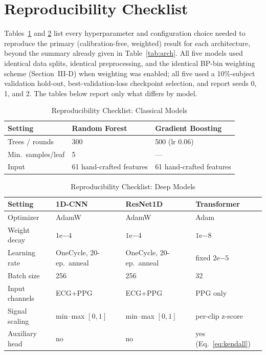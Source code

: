 \documentclass[journal]{IEEEtran}
\begin{document}
\appendix
\section{Reproducibility Checklist}
Tables~\ref{tab:repro-classical} and \ref{tab:repro-deep} list every hyperparameter and configuration choice needed to reproduce the primary (calibration-free, weighted) result for each architecture, beyond the summary already given in Table~\ref{tab:arch}. All five models used identical data splits, identical preprocessing, and the identical BP-bin weighting scheme (Section~III-D) when weighting was enabled; all five used a 10\%-subject validation hold-out, best-validation-loss checkpoint selection, and report seeds 0, 1, and 2. The tables below report only what differs by model.

\begin{table}[!t]
\caption{Reproducibility Checklist: Classical Models}
\label{tab:repro-classical}
\centering
\footnotesize
\begin{tabular}{lp{2.5cm}p{2.5cm}}
\toprule
Setting & Random Forest & Gradient Boosting \\
\midrule
Trees / rounds & 300 & 500 (lr 0.06) \\
Min.\ samples/leaf & 5 & --- \\
Input & 61 hand-crafted features & 61 hand-crafted features \\
\bottomrule
\end{tabular}
\end{table}

\begin{table}[!t]
\caption{Reproducibility Checklist: Deep Models}
\label{tab:repro-deep}
\centering
\footnotesize
\begin{tabular}{lp{1.65cm}p{1.65cm}p{1.65cm}}
\toprule
Setting & 1D-CNN & ResNet1D & Transformer \\
\midrule
Optimizer & AdamW & AdamW & Adam \\
Weight decay & $1\mathrm{e}{-4}$ & $1\mathrm{e}{-4}$ & $1\mathrm{e}{-8}$ \\
Learning rate & OneCycle, 20-ep.\ anneal & OneCycle, 20-ep.\ anneal & fixed $2\mathrm{e}{-5}$ \\
Batch size & 256 & 256 & 32 \\
Input channels & ECG+PPG & ECG+PPG & PPG only \\
Signal scaling & min--max $[0,1]$ & min--max $[0,1]$ & per-clip z-score \\
Auxiliary head & no & no & yes (Eq.~\eqref{eq:kendall}) \\
\bottomrule
\end{tabular}
\end{table}
\end{document}
